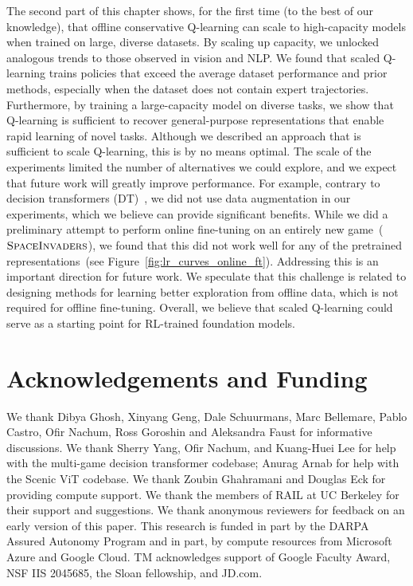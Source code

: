 \documentclass[../thesis.tex]{subfiles}
\begin{document}
The second part of this chapter shows, for the first time (to the best of our knowledge), that offline conservative Q-learning can scale to high-capacity models when trained on large, diverse datasets. By scaling up capacity, we unlocked analogous trends to those observed in vision and NLP. We found that scaled Q-learning trains policies that exceed the average dataset performance and prior methods, especially when the dataset does not contain expert trajectories. Furthermore, by training a large-capacity model on diverse tasks, we show that Q-learning is sufficient to recover general-purpose representations that enable rapid learning of novel tasks. Although we described an approach that is sufficient to scale Q-learning, this is by no means optimal. The scale of the experiments limited the number of alternatives we could explore, and we expect that future work will greatly improve performance.
For example, contrary to decision transformers (DT)~\citep{lee2022multi}, we did not use data augmentation in our experiments, which we believe can provide significant benefits. While we did a preliminary attempt to perform online fine-tuning on an entirely new game~($\textsc{SpaceInvaders}$), we found that this did not work well for any of the pretrained representations~(see Figure~\ref{fig:lr_curves_online_ft}). Addressing this is an important direction for future work. We speculate that this challenge is related to designing methods for learning better exploration from offline data, which is not required for offline fine-tuning. Overall, we believe that scaled Q-learning could serve as a starting point for RL-trained foundation models.

\section*{Acknowledgements and Funding}
We thank Dibya Ghosh, Xinyang Geng, Dale Schuurmans, Marc Bellemare, Pablo Castro, Ofir Nachum, Ross Goroshin and Aleksandra Faust for informative discussions. We thank Sherry Yang, Ofir Nachum, and Kuang-Huei Lee for help with the multi-game decision transformer codebase; Anurag Arnab for help with the Scenic ViT codebase. We thank Zoubin Ghahramani and Douglas Eck for providing compute support. We thank the members of RAIL at UC Berkeley for their support and suggestions. We thank anonymous reviewers for feedback on an early version of this paper. This research is funded in part by the DARPA Assured Autonomy Program and in part, by compute resources from Microsoft Azure and Google Cloud. TM acknowledges support of Google Faculty Award, NSF IIS 2045685, the Sloan fellowship, and JD.com.
\end{document}

